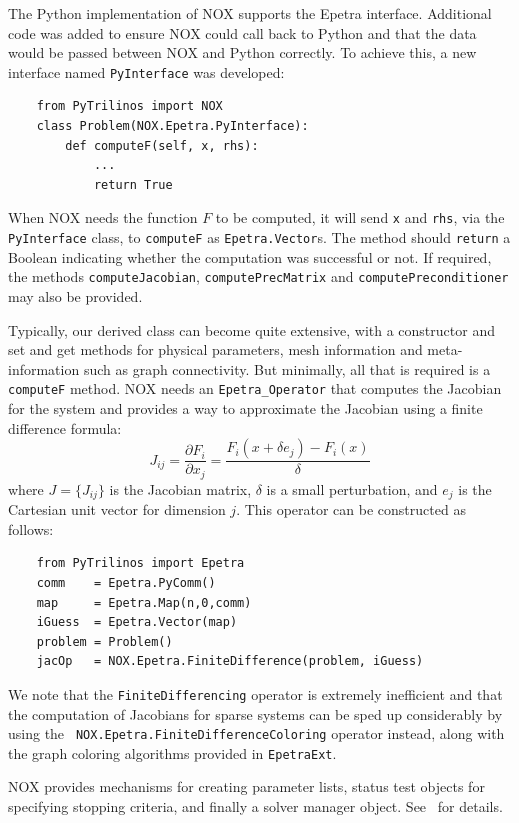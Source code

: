 \documentclass[acmtocl]{acmtrans2m}
\begin{document}
The Python implementation of NOX supports the Epetra interface.
Additional code was added to ensure NOX could call back to Python and
that the data would be passed between NOX and Python correctly.  To
achieve this, a new interface named {\tt PyInterface} was developed:
\begin{verbatim}
    from PyTrilinos import NOX
    class Problem(NOX.Epetra.PyInterface):
        def computeF(self, x, rhs):
            ...
            return True
\end{verbatim}
When NOX needs the function $F$ to be computed, it will send {\tt x}
and {\tt rhs}, via the {\tt PyInterface} class, to {\tt computeF} as
{\tt Epetra.Vector}s.  The method should {\tt return} a Boolean
indicating whether the computation was successful or not.  If
required, the methods {\tt computeJacobian}, {\tt computePrecMatrix}
and {\tt computePreconditioner} may also be provided.

Typically, our derived class can become quite extensive, with a
constructor and set and get methods for physical parameters, mesh
information and meta-information such as graph connectivity.  But
minimally, all that is required is a {\tt computeF} method.  NOX needs
an {\tt Epetra\_Operator} that computes the Jacobian for the system
and provides a way to approximate the Jacobian using a finite
difference formula:
\begin{equation}
  J_{ij} = \frac{\partial F_i}{\partial x_j} = \frac{F_i(x+\delta e_j)
    - F_i(x)}{\delta}
\end{equation}
where $J=\{J_{ij}\}$ is the Jacobian matrix, $\delta$ is a small
perturbation, and $e_j$ is the Cartesian unit vector for dimension
$j$.  This operator can be constructed as follows:
\begin{verbatim}
    from PyTrilinos import Epetra
    comm    = Epetra.PyComm()
    map     = Epetra.Map(n,0,comm)
    iGuess  = Epetra.Vector(map)
    problem = Problem()
    jacOp   = NOX.Epetra.FiniteDifference(problem, iGuess)
\end{verbatim}
We note that the {\tt FiniteDifferencing} operator is extremely
inefficient and that the computation of Jacobians for sparse systems
can be sped up considerably by using the {\tt
  NOX.Epetra.FiniteDifferenceColoring} operator instead, along with
the graph coloring algorithms provided in {\tt EpetraExt}.

NOX provides mechanisms for creating parameter lists, status test
objects for specifying stopping criteria, and finally a solver
manager object.  See~\cite{NOX-home-page} for details.
\end{document}

